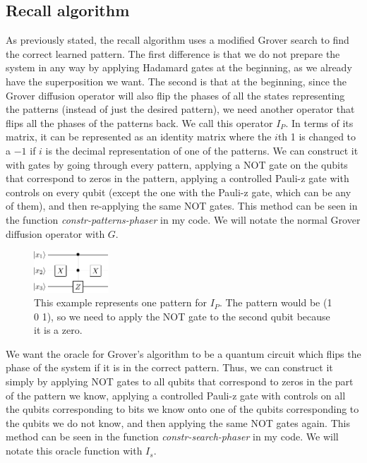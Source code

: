 \documentclass[11pt]{report}
\newcommand{\?}{\stackrel{?}{=}}
\begin{document}
\subsection{Recall algorithm}

As previously stated, the recall algorithm uses a modified Grover search to find the correct learned pattern. The first difference is that we do not prepare the system in any way by applying Hadamard gates at the beginning, as we already have the superposition we want. The second is that at the beginning, since the Grover diffusion operator will also flip the phases of all the states representing the patterns (instead of just the desired pattern), we need another operator that flips all the phases of the patterns back. We call this operator $I_P$. In terms of its matrix, it can be represented as an identity matrix where the $i$th 1 is changed to a $-1$ if $i$ is the decimal representation of one of the patterns. We can construct it with gates by going through every pattern, applying a NOT gate on the qubits that correspond to zeros in the pattern, applying a controlled Pauli-z gate with controls on every qubit (except the one with the Pauli-z gate, which can be any of them), and then re-applying the same NOT gates. This method can be seen in the function \textit{constr-patterns-phaser} in my code. We will notate the normal Grover diffusion operator with $G$.

\begin{figure}[!htb]
\centering
\includegraphics[width=0.25\textwidth]{resources/pdfs/assoc2-crop.pdf}
\caption{This example represents one pattern for $I_P$. The pattern would be (1 0 1), so we need to apply the NOT gate to the second qubit because it is a zero.}
\label{fig:digraph2}
\end{figure}

We want the oracle for Grover's algorithm to be a quantum circuit which flips the phase of the system if it is in the correct pattern. Thus, we can construct it simply by applying NOT gates to all qubits that correspond to zeros in the part of the pattern we know, applying a controlled Pauli-z gate with controls on all the qubits corresponding to bits we know onto one of the qubits corresponding to the qubits we do not know, and then applying the same NOT gates again. This method can be seen in the function \textit{constr-search-phaser} in my code. We will notate this oracle function with $I_s$.
\end{document}
